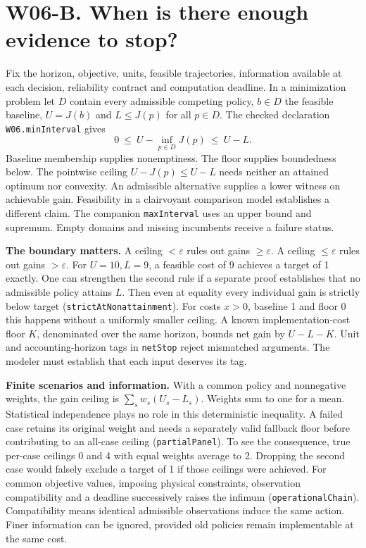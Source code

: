 \documentclass[10pt,letterpaper]{article}
\begin{document}
\section{W06-B. When is there enough evidence to stop?}
Fix the horizon, objective, units, feasible trajectories, information available at each decision, reliability contract and computation deadline. In a minimization problem let $D$ contain every admissible competing policy, $b\in D$ the feasible baseline, $U=J(b)$ and $L\leq J(p)$ for all $p\in D$. The checked declaration \texttt{W06.minInterval} gives
\[
 0\ \leq\ U-\inf_{p\in D}J(p)\ \leq\ U-L .
\]
Baseline membership supplies nonemptiness. The floor supplies boundedness below. The pointwise ceiling $U-J(p)\leq U-L$ needs neither an attained optimum nor convexity. An admissible alternative supplies a lower witness on achievable gain. Feasibility in a clairvoyant comparison model establishes a different claim. The companion \texttt{maxInterval} uses an upper bound and supremum. Empty domains and missing incumbents receive a failure status.

\textbf{The boundary matters.} A ceiling $<\varepsilon$ rules out gains $\geq\varepsilon$. A ceiling $\leq\varepsilon$ rules out gains $>\varepsilon$. For $U=10,L=9$, a feasible cost of 9 achieves a target of 1 exactly. One can strengthen the second rule if a separate proof establishes that no admissible policy attains $L$. Then even at equality every individual gain is strictly below target (\texttt{strictAtNonattainment}). For costs $x>0$, baseline 1 and floor 0 this happens without a uniformly smaller ceiling. A known implementation-cost floor $K$, denominated over the same horizon, bounds net gain by $U-L-K$. Unit and accounting-horizon tags in \texttt{netStop} reject mismatched arguments. The modeler must establish that each input deserves its tag.

\textbf{Finite scenarios and information.} With a common policy and nonnegative weights, the gain ceiling is $\sum_s w_s(U_s-L_s)$. Weights sum to one for a mean. Statistical independence plays no role in this deterministic inequality. A failed case retains its original weight and needs a separately valid fallback floor before contributing to an all-case ceiling (\texttt{partialPanel}). To see the consequence, true per-case ceilings 0 and 4 with equal weights average to 2. Dropping the second case would falsely exclude a target of 1 if those ceilings were achieved. For common objective values, imposing physical constraints, observation compatibility and a deadline successively raises the infimum (\texttt{operationalChain}). Compatibility means identical admissible observations induce the same action. Finer information can be ignored, provided old policies remain implementable at the same cost.
\end{document}

